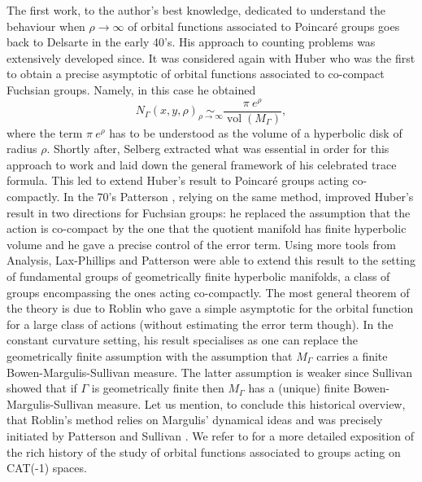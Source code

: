 \documentclass[JEP,XML,SOM,Unicode,NoFloatCountersInSection,published]{cedram}
\theoremstyle{plain}
\theoremstyle{definition}
\newcommand{\equivaut}[1]{\underset{#1}{\sim}}
\DeclareMathOperator{\vol}{vol}
\begin{document}
The first work, to the author's best knowledge, dedicated to understand the behaviour when $\rho \to \infty$ of orbital functions associated to Poincaré groups goes back to Delsarte \cite{artdelsarte} in the early 40's. His approach to counting problems was extensively developed since. It was considered again with Huber \cite{arthuber2} who was the first to obtain a precise asymptotic of orbital functions associated to co-compact Fuchsian groups. Namely, in this case he obtained
\[
N_{\Gamma}(x,y,\rho) \equivaut{\rho \to \infty} \frac{\pi \ e^{\rho}}{\vol(M_{\Gamma})},
\]
where the term $\pi \ e^{\rho}$ has to be understood as the volume of a hyperbolic disk of radius $\rho$. Shortly after, Selberg \cite{artselberg2,artselberg} extracted what was essential in order for this approach to work and laid down the general framework of his celebrated trace formula. This led to extend Huber's result to Poincaré groups acting co-compactly. In the 70's Patterson \cite{artpattersontermeerror}, relying on the same method, improved Huber's result in two directions for Fuchsian groups: he replaced the assumption that the action is co-compact by the one that the quotient manifold has finite hyperbolic volume and he gave a precise control of the error term. Using more tools from Analysis, Lax-Phillips \cite{articlelax} and Patterson \cite{articlepatteron2} were able to extend this result to the setting of fundamental groups of geometrically finite hyperbolic manifolds, a class of groups encompassing the ones acting co-compactly. The most general theorem of the theory is due to Roblin \cite{memoireroblin} who gave a simple asymptotic for the orbital function for a large class of actions (without estimating the error term though). In the constant curvature setting, his result specialises as one can replace the geometrically finite assumption with the assumption that $M_{\Gamma}$ carries a finite Bowen-Margulis-Sullivan measure. The latter assumption is weaker since Sullivan showed \cite{artsullivanmesurebms} that if $\Gamma$ is geometrically finite then $M_\Gamma$ has a (unique) finite Bowen-Margulis-Sullivan measure. Let us mention, to conclude this historical overview, that Roblin's method relies on Margulis' dynamical ideas \cite{artmargulismixing} and was precisely initiated by Patterson \cite{arttersondensiteconforme} and Sullivan \cite{artsullivandensiteconforme, artsullivanmesurebms}. We refer to \cite{livremartine} for a more detailed exposition of the rich history of the study of orbital functions associated to groups acting on CAT(-1) spaces.
\end{document}
